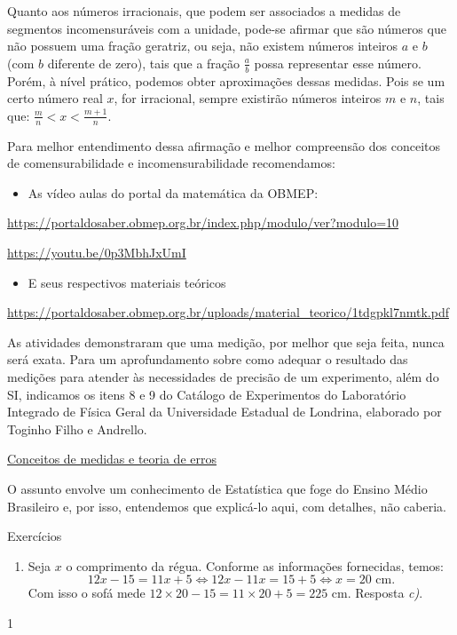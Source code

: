 Quanto aos números irracionais, que podem ser associados a medidas de segmentos incomensuráveis com a unidade, pode-se afirmar que são números que não possuem uma fração geratriz, ou seja, não existem números inteiros $a$ e $b$ (com $b$ diferente de zero), tais que a fração $\displaystyle\frac{a}{b}$ possa representar esse número. Porém, à nível prático, podemos obter aproximações dessas medidas. Pois se um certo número real $x$, for irracional, sempre existirão números inteiros $m$ e $n$, tais que: $\displaystyle\frac{m}{n}<x<\frac{m+1}{n}$.

\clearpage
\know{}
\label{\detokenize{NO103-5:para-saber-mais}}
Para melhor entendimento dessa afirmação e melhor compreensão dos conceitos de comensurabilidade e incomensurabilidade recomendamos:
\begin{itemize}
\item {} 
As vídeo aulas do portal da matemática da OBMEP:

\end{itemize}

\url{https://portaldosaber.obmep.org.br/index.php/modulo/ver?modulo=10}

\url{https://youtu.be/0p3MbhJxUmI}
\begin{itemize}
\item {} 
E seus respectivos materiais teóricos

\end{itemize}

\url{https://portaldosaber.obmep.org.br/uploads/material\_teorico/1tdgpkl7nmtk.pdf}

As atividades demonstraram que uma medição, por melhor que seja feita, nunca será exata. Para um aprofundamento sobre como adequar o resultado das medições para atender às necessidades de precisão de um experimento, além do SI, indicamos os itens 8 e 9 do Catálogo de Experimentos do Laboratório Integrado de Física Geral da Universidade Estadual de Londrina, elaborado por Toginho Filho e Andrello.

\href{http://www.uel.br/pessoal/inocente/pages/arquivos/03-Conceitos\%20de\%20medidas\%20e\%20teoria\%20de\%20erros.pdf}{Conceitos de medidas e teoria de erros}

O assunto envolve um conhecimento de Estatística que foge do Ensino Médio Brasileiro e, por isso, entendemos que explicá-lo aqui, com detalhes, não caberia.

\clearmargin
\exercise

\begin{answer}{Exercícios}
{\exerciselist
\begin{enumerate}
\item Seja \(x\) o comprimento da régua. Conforme as informações fornecidas, temos:
\begin{equation*}
12x - 15 = 11x + 5 \Leftrightarrow 12x - 11x = 15 + 5 \Leftrightarrow x = 20 \text{ cm}.
\end{equation*}
Com isso o sofá mede \(12 \times 20 - 15 = 11 \times 20 + 5 = 225\) cm. Resposta \textit{c)}.
\end{enumerate}
}{1}
\end{answer}
\clearmargin


